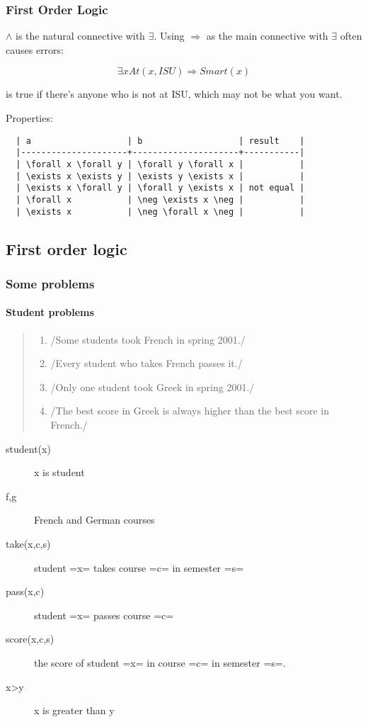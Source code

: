 \subsubsection{First Order Logic}
$\wedge$ is the natural connective with $\exists$.
Using $\Rightarrow$ as the main connective with $\exists$ often causes errors:

$$\exists x At(x,ISU) \Rightarrow Smart(x)$$

is true if there's anyone who is not at ISU, which may not be what you want.

Properties:
\begin{lstlisting}
  | a                   | b                   | result    |
  |---------------------+---------------------+-----------|
  | \forall x \forall y | \forall y \forall x |           |
  | \exists x \exists y | \exists y \exists x |           |
  | \exists x \forall y | \forall y \exists x | not equal |
  | \forall x           | \neg \exists x \neg |           |
  | \exists x           | \neg \forall x \neg |           |
\end{lstlisting}



\subsection{First order logic}
\subsubsection{Some problems}
\paragraph{Student problems}
\begin{quote}
  \begin{enumerate}
  \item /Some students took French in spring 2001./
  \item /Every student who takes French passes it./
  \item /Only one student took Greek in spring 2001./
  \item /The best score in Greek is always higher than the best score in French./
  \end{enumerate}
\end{quote}

\begin{description}
\item [student(x)] x is student
\item [f,g] French and German courses
\item [take(x,c,s)] student =x= takes course =c= in semester =s=
\item [pass(x,c)] student =x= passes course =c=
\item [score(x,c,s)] the score of student =x= in course =c= in semester =s=.
\item [x>y] x is greater than y
\end{description}

